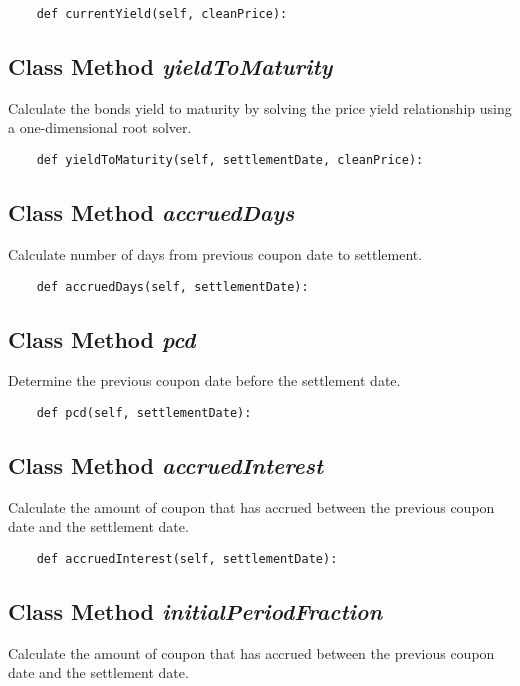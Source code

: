 \documentclass[twoside,11pt]{book}
\begin{document}
\begin{lstlisting}
    def currentYield(self, cleanPrice):
\end{lstlisting}

\subsection{Class Method {\it yieldToMaturity}}
Calculate the bonds yield to maturity by solving the price yield relationship using a one-dimensional root solver. 

\begin{lstlisting}
    def yieldToMaturity(self, settlementDate, cleanPrice):
\end{lstlisting}

\subsection{Class Method {\it accruedDays}}
Calculate number of days from previous coupon date to settlement.

\begin{lstlisting}
    def accruedDays(self, settlementDate):
\end{lstlisting}

\subsection{Class Method {\it pcd}}
Determine the previous coupon date before the settlement date. 

\begin{lstlisting}
    def pcd(self, settlementDate):
\end{lstlisting}

\subsection{Class Method {\it accruedInterest}}
Calculate the amount of coupon that has accrued between the previous coupon date and the settlement date. 

\begin{lstlisting}
    def accruedInterest(self, settlementDate):
\end{lstlisting}

\subsection{Class Method {\it initialPeriodFraction}}
Calculate the amount of coupon that has accrued between the previous coupon date and the settlement date. 
\end{document}

